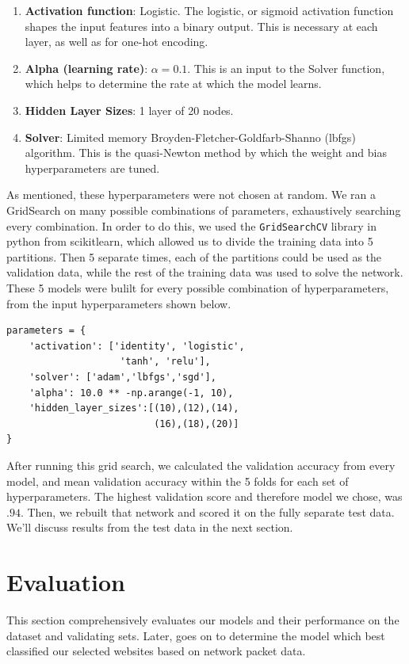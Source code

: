 \documentclass[10pt,sigconf,letterpaper,nonacm]{acmart}
\begin{document}
\begin{enumerate}
    \item {\bf Activation function}: Logistic. The logistic, or sigmoid activation function shapes the input features into a binary output. This is necessary at each layer, as well as for one-hot encoding.
    \item {\bf Alpha (learning rate)}: $\alpha = 0.1$. This is an input to the Solver function, which helps to determine the rate at which the model learns.
    \item {\bf Hidden Layer Sizes}: 1 layer of 20 nodes. 
    \item {\bf Solver}: Limited memory Broyden-Fletcher-Goldfarb-Shanno (lbfgs) algorithm. This is the quasi-Newton method by which the weight and bias hyperparameters are tuned. 
\end{enumerate}

As mentioned, these hyperparameters were not chosen at random. We ran a GridSearch on many possible combinations of parameters, exhaustively searching every combination. In order to do this, we used the \texttt{GridSearchCV} library in python from scikitlearn, which allowed us to divide the training data into 5 partitions. Then 5 separate times, each of the partitions could be used as the validation data, while the rest of the training data was used to solve the network. These 5 models were bulilt for every possible combination of hyperparameters, from the input hyperparameters shown below.

\begin{verbatim}
parameters = {
    'activation': ['identity', 'logistic', 
                    'tanh', 'relu'],
    'solver': ['adam','lbfgs','sgd'],
    'alpha': 10.0 ** -np.arange(-1, 10),
    'hidden_layer_sizes':[(10),(12),(14),
                          (16),(18),(20)]
}
\end{verbatim}

After running this grid search, we calculated the validation accuracy from every model, and mean validation accuracy within the 5 folds for each set of hyperparameters. The highest validation score and therefore model we chose, was $.94$. 
Then, we rebuilt that network and scored it on the fully separate test data. We'll discuss results from the test data in the next section.

\section{Evaluation}
This section comprehensively evaluates our models and their performance on the dataset and validating sets. Later, goes on to determine the model which best classified our selected websites based on network packet data.
\end{document}
